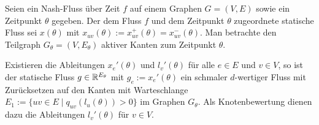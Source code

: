 \begin{theorem}
	Seien ein Nash-Fluss über Zeit $f$ auf einem Graphen $G=(V,E)$ sowie ein Zeitpunkt $\theta$ gegeben.
	Der dem Fluss $f$ und dem Zeitpunkt $\theta$ zugeordnete statische Fluss sei $x(\theta)$ mit $x_{uv}(\theta) := x^+_{uv}(\theta) = x^-_{uv}(\theta)$.
	Man betrachte den Teilgraph $G_\theta = (V, E_\theta)$ aktiver Kanten zum Zeitpunkt $\theta$.
	
	Existieren die Ableitungen $x_e'(\theta)$ und $l_v'(\theta)$ für alle $e\in E$ und $v\in V$, so ist der statische Fluss $g\in\mathbb{R}^{E_\theta}$ mit $g_e:=x_e'(\theta)$ ein schmaler $d$-wertiger Fluss mit Zurücksetzen auf den Kanten mit Warteschlange $E_1:=\{uv\in E \mid q_{uv}(l_u(\theta))>0 \}$ im Graphen $G_\theta$.
	Als Knotenbewertung dienen dazu die Ableitungen $l_v'(\theta)$ für $v\in V$.
\end{theorem}

